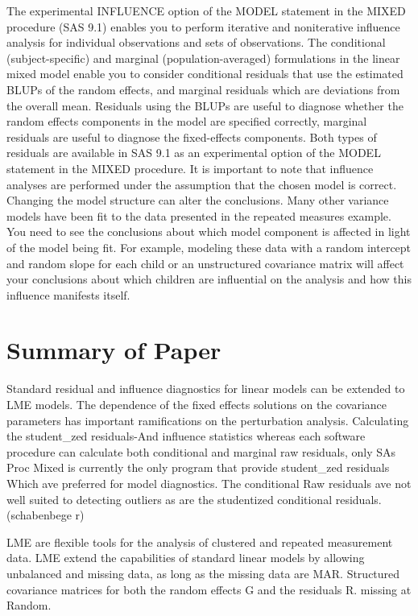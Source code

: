\documentclass[Chap5amain.tex]{subfiles}
\begin{document}
The experimental INFLUENCE
option of the MODEL statement in the MIXED procedure (SAS 9.1) enables you to perform iterative and
noniterative influence analysis for individual observations and sets of observations.
The conditional (subject-specific) and marginal (population-averaged) formulations in the linear mixed model
enable you to consider conditional residuals that use the estimated BLUPs of the random effects, and
marginal residuals which are deviations from the overall mean. Residuals using the BLUPs are useful to
diagnose whether the random effects components in the model are specified correctly, marginal residuals
are useful to diagnose the fixed-effects components. Both types of residuals are available in SAS 9.1 as an
experimental option of the MODEL statement in the MIXED procedure.
It is important to note that influence analyses are performed under the assumption that the chosen model
is correct. Changing the model structure can alter the conclusions. Many other variance models have been
fit to the data presented in the repeated measures example. You need to see the conclusions about which
model component is affected in light of the model being fit. For example, modeling these data with a random
intercept and random slope for each child or an unstructured covariance matrix will affect your conclusions
about which children are influential on the analysis and how this influence manifests itself.
\section{Summary of Paper}
Standard residual and influence diagnostics for linear models can be extended to LME models.
The dependence of the fixed effects solutions on the covariance parameters has important ramifications on the perturbation analysis.	
Calculating the student_zed residuals-And influence statistics whereas each software procedure can calculate both conditional and marginal raw residuals, only SAs Proc Mixed is currently the only program that provide student_zed residuals Which ave preferred for model diagnostics. The conditional Raw residuals ave not well suited to detecting outliers as are the studentized conditional residuals. (schabenbege r)
 
 
LME are flexible tools for the analysis of clustered and repeated measurement data. LME extend the capabilities of standard linear models by allowing unbalanced and missing data, as long as the missing data are MAR. Structured covariance matrices for both the random effects G and the residuals R. missing at Random.
 
\end{document}

